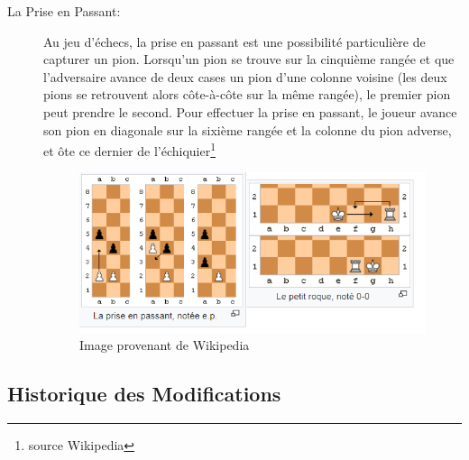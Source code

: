 \documentclass[10pt, a4paper]{article}
\begin{document}
\begin{description}
		\item[La Prise en Passant:] Au jeu d’échecs, la prise en passant est une possibilité particulière de capturer un pion. Lorsqu’un pion se trouve sur la cinquième rangée et que l’adversaire avance de deux cases un pion d’une colonne voisine (les deux pions se retrouvent alors côte-à-côte sur la même rangée), le premier pion peut prendre le second. Pour effectuer la prise en passant, le joueur avance son pion en diagonale sur la sixième rangée et la colonne du pion adverse, et ôte ce dernier de l’échiquier\footnote{source Wikipedia}
		\begin{figure}[bh]
		\centering
		\includegraphics[scale=1]{roque_prise_passant.png}
		\caption{Image provenant de Wikipedia}
		\end{figure}
		
		\end{description}
		\clearpage

		\subsection{Historique des Modifications}
\end{document}
